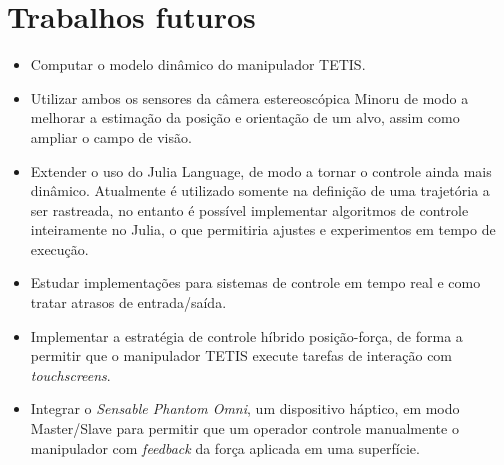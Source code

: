 \section{Trabalhos futuros}
\begin{itemize}
\item Computar o modelo dinâmico do manipulador TETIS.

\item Utilizar ambos os sensores da câmera estereoscópica Minoru de modo a melhorar a estimação da posição e orientação de um alvo, assim como ampliar o campo de visão.

\item Extender o uso do Julia Language, de modo a tornar o controle ainda mais dinâmico. Atualmente é utilizado somente na definição de uma trajetória a ser rastreada, no entanto é possível implementar algoritmos de controle inteiramente no Julia, o que permitiria ajustes e experimentos em tempo de execução.

\item Estudar implementações para sistemas de controle em tempo real e como tratar atrasos de entrada/saída.

\item Implementar a estratégia de controle híbrido posição-força, de forma a permitir que o manipulador TETIS execute tarefas de interação com \textit{touchscreens}.

\item Integrar o \textit{Sensable Phantom Omni}, um dispositivo háptico, em modo Master/Slave para permitir que um operador controle manualmente o manipulador com \textit{feedback} da força aplicada em uma superfície.
\end{itemize}


